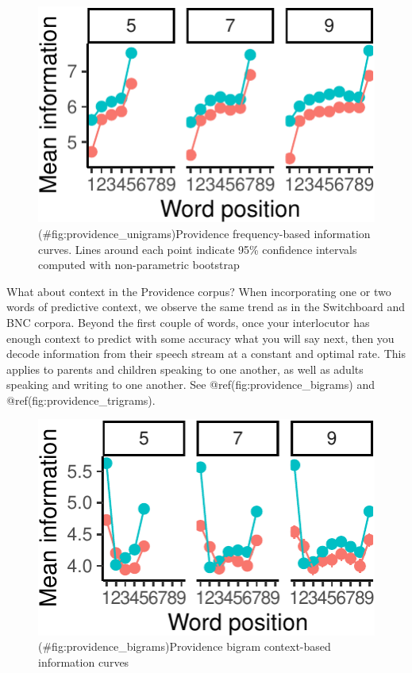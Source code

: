 \documentclass[man,floatsintext]{apa6}
\begin{document}
\begin{figure}
\centering
\includegraphics{figs/providence_unigrams-1.pdf}
\caption{(\#fig:providence\_unigrams)Providence frequency-based information curves. Lines around each point indicate 95\% confidence intervals computed with non-parametric bootstrap}
\end{figure}

What about context in the Providence corpus? When incorporating one or two words of predictive context, we observe the same trend as in the Switchboard and BNC corpora. Beyond the first couple of words, once your interlocutor has enough context to predict with some accuracy what you will say next, then you decode information from their speech stream at a constant and optimal rate. This applies to parents and children speaking to one another, as well as adults speaking and writing to one another. See @ref(fig:providence\_bigrams) and @ref(fig:providence\_trigrams).

\begin{figure}
\centering
\includegraphics{figs/providence_bigrams-1.pdf}
\caption{(\#fig:providence\_bigrams)Providence bigram context-based information curves}
\end{figure}
\end{document}
